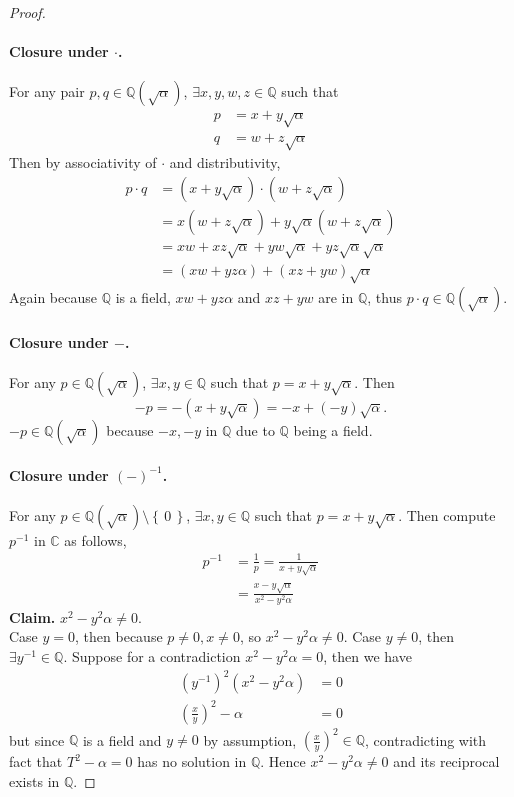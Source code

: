 \documentclass{article}
\theoremstyle{definition}
\numberwithin{equation}{problem}
\newcommand{\Q}{\mathbb{Q}}
\newcommand{\C}{\mathbb{C}}
\newcommand{\set}[1]{\left\{\,#1\,\right\}}
\begin{document}
\begin{proof}
    \paragraph{Closure under $\cdot$.} For any pair $p,q \in \Q(\sqrt{\alpha})$,
    $\exists x, y, w, z\in \Q$ such that
    \begin{align*}
        p &= x + y\sqrt{\alpha}  \\
        q &= w + z\sqrt{\alpha}
    \end{align*}
    Then by associativity of $\cdot$ and distributivity,
    \begin{align*}
        p\cdot q &= (x + y\sqrt{\alpha}) \cdot (w + z\sqrt{\alpha}) \\
        &= x(w + z\sqrt{\alpha}) + y\sqrt{\alpha}(w + z\sqrt{\alpha})   \\
        &= x w + x z \sqrt{\alpha} + y w \sqrt{\alpha} + y z \sqrt{\alpha} \sqrt{\alpha}    \\
        &= (x w + y z \alpha) + (x z + y w) \sqrt{\alpha}
    \end{align*}
    Again because $\Q$ is a field, $x w + y z \alpha$ and $x z + y w$ are in $\Q$,
    thus $p\cdot q\in \Q(\sqrt{\alpha})$.

    \paragraph{Closure under $-$.} For any $p \in \Q(\sqrt{\alpha})$,
    $\exists x, y \in \Q$ such that $p = x + y\sqrt{\alpha}$.
    Then
    \[-p = -(x + y\sqrt{\alpha}) = -x + (-y)\sqrt{\alpha}.\]
    $-p \in \Q(\sqrt{\alpha})$ because $-x, -y$ in $\Q$ due to $\Q$ being a field.

    \paragraph{Closure under $(-)^{-1}$.} For any $p \in \Q(\sqrt{\alpha})\setminus \set{0}$,
    $\exists x, y \in \Q$ such that $p = x + y\sqrt{\alpha}$.
    Then compute $p^{-1}$ in $\C$ as follows,
    \begin{align*}
        p^{-1} &= \frac{1}{p} = \frac{1}{x + y\sqrt{\alpha}}    \\
        &= \frac{x - y\sqrt{\alpha}}{x^2 - y^2 \alpha}
    \end{align*}
    \textbf{Claim.} $x^2 - y^2 \alpha \ne 0$.\\
    Case $y=0$, then because $p\ne 0, x\ne 0$, so $x^2 - y^2 \alpha \ne 0$.
    Case $y\ne 0$, then $\exists y^{-1} \in \Q$. Suppose for a contradiction $x^2 - y^2\alpha = 0$, then we have
    \begin{align*}
        (y^{-1})^2 (x^2 - y^2\alpha) &= 0 \\
        \left(\frac{x}{y}\right)^2 - \alpha &= 0
    \end{align*}
    but since $\Q$ is a field and $y \ne 0$ by assumption, $(\frac{x}{y})^2 \in \Q$,
    contradicting with fact that $T^2 - \alpha = 0$ has no solution in $\Q$.
    Hence $x^2 - y^2 \alpha \ne 0$ and its reciprocal exists in $\Q$.


\end{proof}
\end{document}
